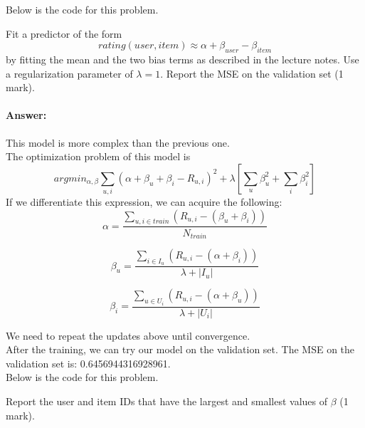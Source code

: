 \documentclass{assignment}
\begin{document}
\begin{problemlist}
Below is the code for this problem.

\newpage

\pbitem
Fit a predictor of the form
\begin{equation}
rating(user, item) \approx \alpha + \beta_{user} -\beta_{item}
\end{equation}
by fitting the mean and the two bias terms as described in the lecture notes. Use a regularization parameter of $\lambda = 1$. Report the MSE on the validation set (1 mark).

\paragraph{Answer:}
This model is more complex than the previous one.\\
The optimization problem of this model is
\begin{equation}
argmin_{\alpha, \beta} \sum_{u,i}(\alpha + \beta_u +\beta_i - R_{u, i})^2 + \lambda[\sum_u \beta_u^2 + \sum_i \beta_i^2]
\end{equation}
If we differentiate this expression, we can acquire the following:
\begin{equation}
\alpha = \frac{\sum_{u,i \in train}(R_{u,i}-(\beta_u + \beta_i))}{N_{train}}
\end{equation}

\begin{equation}
\beta_u = \frac{\sum_{i \in I_u}(R_{u,i}-(\alpha + \beta_i))}{\lambda + \left|{I_u}\right|}
\end{equation}

\begin{equation}
\beta_i = \frac{\sum_{u \in U_i}(R_{u,i}-(\alpha + \beta_u))}{\lambda + \left|{U_i}\right|}
\end{equation}

We need to repeat the updates above until convergence.\\
After the training, we can try our model on the validation set. The MSE on the validation set is: 0.6456944316928961.\\

Below is the code for this problem.


\newpage


\pbitem
Report the user and item IDs that have the largest and smallest values of $\beta$ (1 mark).

\end{problemlist}
\end{document}
